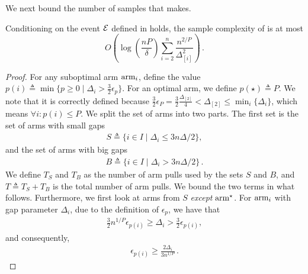 We next bound the number of samples that  makes.

\begin{lemma}\label{lem:bound-pull}
    Conditioning on the event \(\mathcal{E}\) defined in  holds, the sample complexity of  is at most 
    \begin{equation*}
        O\left(\log \left(\frac{nP}{\delta} \right) \sum_{i =2}^n \frac{n^{2/P}}{\Delta^2_{[i]}}\right)\,.
    \end{equation*}
\end{lemma}

\begin{proof}
    For any suboptimal arm $\textnormal{arm}_{i}$, define the value \(p(i) \triangleq \min\{p \ge 0 \mid \Delta_i > \frac{3}{2}\epsilon_p\}\). For an optimal arm, we define \(p(\star) \triangleq P\). We note that it is correctly defined because \(\frac{3}{2}\epsilon_P = \frac{3}{2} \frac{\Delta_{[2]}}{4} < \Delta_{[2]} \le \min_i \{\Delta_i\}\), which means \(\forall i : p(i) \le P\). We split the set of arms into two parts. The first set is the set of arms with small gaps
    \begin{align*}
        S \triangleq \{i \in I\mid \Delta_i \le 3 n \Delta / 2\},
    \end{align*}
    and the set of arms with big gaps
    \begin{align*}
        B \triangleq \{i \in I\mid \Delta_i > 3 n \Delta / 2\}\,.
    \end{align*}
    \noindent
    We define \(T_{S}\) and \(T_{B}\) as the number of arm pulls used by the sets \(S\) and \(B\), and \(T\triangleq T_{S}+T_{B}\) is the total number of arm pulls. We bound the two terms in what follows. 
    Furthermore, we first look at arms from \(S\) \emph{except} \(\textnormal{arm}^{\star}\). For \(\textnormal{arm}_{i}\) with gap parameter \(\Delta_{i}\), due to the definition of \(\epsilon_p\), we have that 
    \begin{align*}
        \frac{3}{2} n^{1/P} \epsilon_{p(i)}\ge \Delta_i > \frac{3}{2} \epsilon_{p(i)},
    \end{align*}
    and consequently,
    \begin{eqnarray}\label{eq:eps-lower}
        \epsilon_{p(i)} \ge \frac{2\Delta_i}{3 n^{1/P}}\,.
    \end{eqnarray}


\end{proof}
